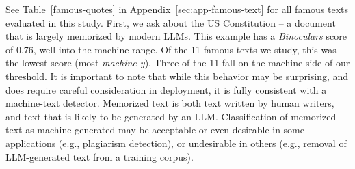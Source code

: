 \documentclass{article} %
\newcommand{\jog}[1]{{\textcolor{teal}{Jonas: \footnotesize\sf[#1]}}}
\begin{document}
See Table~\ref{famous-quotes} in Appendix~\ref{sec:app-famous-text} for all famous texts evaluated in this study.
First, we ask about the US Constitution -- a document that is largely memorized by modern LLMs. %
This example has a \emph{Binoculars} score of 0.76, well into the machine range. Of the 11 famous texts we study, this was the lowest score (most \emph{machine-y}). Three of the 11 fall on the machine-side of our threshold.
It is important to note that while this behavior may be surprising, and does require careful consideration in deployment, it is fully consistent with a machine-text detector.
Memorized text is both text written by human writers, and text that is likely to be generated by an LLM.  
Classification of memorized text as machine generated may be acceptable or even desirable in some applications (e.g., plagiarism detection), or undesirable in others (e.g., removal of LLM-generated text from a training corpus).

\end{document}
